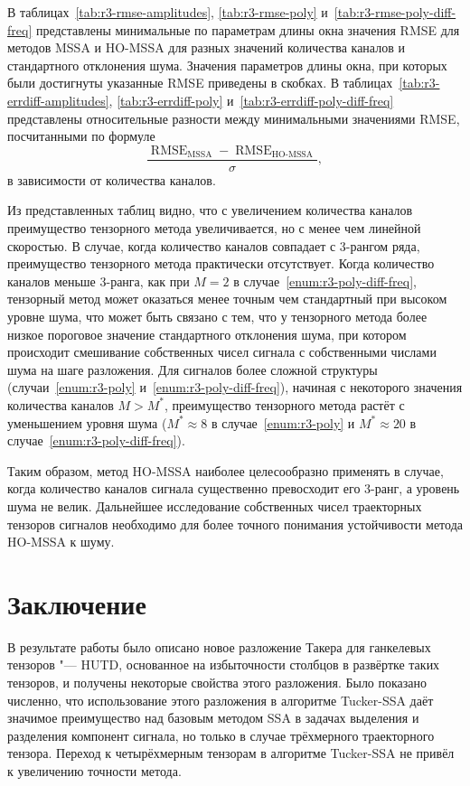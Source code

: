 \documentclass[specialist,
  substylefile = spbu.rtx,
subf,href,colorlinks=true, 12pt]{disser}
\theoremstyle{plain}
\theoremstyle{definition}
\theoremstyle{remark}
\def\newdecomp/{HUTD}
\def\tssa/{Tucker-SSA}
\begin{document}
В таблицах~\ref{tab:r3-rmse-amplitudes}, \ref{tab:r3-rmse-poly}
и~\ref{tab:r3-rmse-poly-diff-freq} представлены
минимальные по
параметрам длины окна значения RMSE для методов MSSA и HO-MSSA для
разных значений количества каналов и стандартного отклонения шума.
Значения параметров длины окна, при которых были достигнуты
указанные RMSE приведены в скобках.
В таблицах~\ref{tab:r3-errdiff-amplitudes}, \ref{tab:r3-errdiff-poly}
и~\ref{tab:r3-errdiff-poly-diff-freq} представлены относительные
разности между минимальными значениями RMSE, посчитанными по формуле
\begin{equation*}
  \label{eq:rmse-errdiff-formula}
  \frac{\operatorname{RMSE}_{\text{MSSA}} -
  \operatorname{RMSE}_{\text{HO-MSSA}}}{\sigma},
\end{equation*}
в зависимости от количества каналов.

Из представленных таблиц видно, что с увеличением количества каналов
преимущество тензорного метода увеличивается, но с менее чем
линейной скоростью.
В случае, когда количество каналов совпадает с 3-рангом ряда,
преимущество тензорного метода практически отсутствует.
Когда количество каналов меньше 3-ранга, как при $M=2$ в
случае~\ref{enum:r3-poly-diff-freq}, тензорный метод может оказаться
менее точным чем стандартный при высоком уровне шума, что может быть
связано с тем, что у тензорного метода более низкое пороговое
значение стандартного отклонения шума, при котором происходит
смешивание собственных чисел сигнала с собственными числами шума на
шаге разложения.
Для сигналов более сложной структуры (случаи~\ref{enum:r3-poly}
и~\ref{enum:r3-poly-diff-freq}), начиная с некоторого значения
количества каналов $M > M^*$, преимущество тензорного метода растёт с
уменьшением уровня шума ($M^* \approx 8$ в случае~\ref{enum:r3-poly} и
$M^* \approx 20$ в случае~\ref{enum:r3-poly-diff-freq}).

Таким образом, метод HO-MSSA наиболее целесообразно применять в случае, когда
количество каналов сигнала существенно превосходит его 3-ранг, а
уровень шума не велик.
Дальнейшее исследование собственных чисел траекторных тензоров
сигналов необходимо для более точного понимания устойчивости метода
HO-MSSA к шуму.

\newpage

\section{Заключение}\label{sec:conclusion}
В результате работы было описано новое разложение Такера для
ганкелевых тензоров "--- \newdecomp/, основанное на избыточности
столбцов в развёртке таких тензоров, и получены некоторые свойства
этого разложения.
Было показано численно, что использование этого разложения в
алгоритме \tssa/ даёт значимое преимущество над базовым методом SSA в
задачах выделения и разделения компонент сигнала, но только в случае
трёхмерного траекторного тензора. Переход к четырёхмерным тензорам в
алгоритме \tssa/ не привёл к увеличению точности метода.
\end{document}
